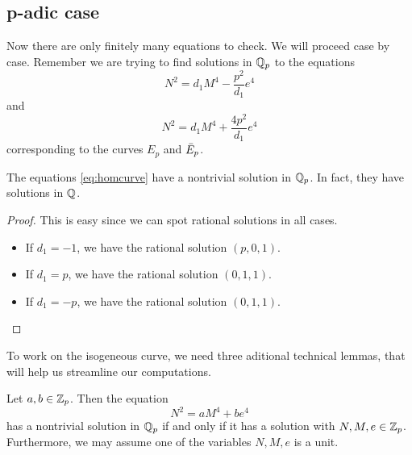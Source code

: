 \documentclass[12pt, a4paper]{report}
\begin{document}
\subsection{p-adic case}
Now there are only finitely many equations to check. We will proceed case by
case. Remember we are trying to find solutions in ${\mathbb Q}_p$ to the equations
\begin{equation} \label{eq:homcurve}
  N^2 = d_1 M^4 - \frac{p^2}{d_1}e^4
\end{equation}
and
\begin{equation} \label{eq:isocurve}
  N^2 = d_1 M^4 + \frac{4p^2}{d_1}e^4
\end{equation}
corresponding to the curves $E_p$ and $\bar{E}_p$.

\begin{thm}
  The equations \ref{eq:homcurve} have a nontrivial solution in ${\mathbb Q}_p$. In fact,
  they have solutions in ${\mathbb Q}$.
\end{thm}
\begin{proof} This is easy since we can spot rational solutions in all cases.
   
  \begin{itemize}
  \item If $d_1 = -1$, we have the rational solution $(p, 0, 1)$.
  \item If $d_1 = p$, we have the rational solution $(0, 1, 1)$.
  \item If $d_1 = -p$, we have the rational solution $(0, 1, 1)$.
  \end{itemize}
\end{proof}

To work on the isogeneous curve, we need three aditional technical lemmas,
that will help us streamline our computations.

\begin{lemma} \label{vanilla}
  Let $a, b \in {\mathbb Z}_p$. Then the equation 
  \begin{equation}
    \label{eq:multvanilla}
    N^2 = aM^4 + be^4
  \end{equation}
  has a nontrivial solution in ${\mathbb Q}_p$ if and only if it has a solution with
  $N, M, e \in {\mathbb Z}_p$. Furthermore, we may assume one of the variables $N, M, e$
  is a unit.
\end{lemma}
\end{document}
